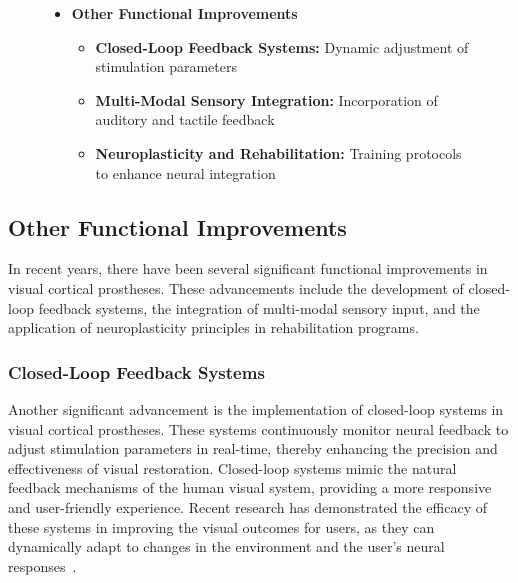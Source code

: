 \documentclass[twocolumn,10pt]{article}
\begin{document}
\begin{figure}[htbp]
\begin{tcolorbox}
\begin{itemize}
                  \item \textbf{Other Functional Improvements}
                        \begin{itemize}
                              \item \textbf{Closed-Loop Feedback Systems:} Dynamic adjustment of stimulation parameters
                              \item \textbf{Multi-Modal Sensory Integration:} Incorporation of auditory and tactile feedback
                              \item \textbf{Neuroplasticity and Rehabilitation:} Training protocols to enhance neural integration
                        \end{itemize}
            \end{itemize}
      \end{tcolorbox}
\end{figure}

\subsection{Other Functional Improvements}
In recent years, there have been several significant functional improvements in
visual cortical prostheses. These advancements include the development of
closed-loop feedback systems, the integration of multi-modal sensory input, and
the application of neuroplasticity principles in rehabilitation programs.

\subsubsection*{Closed-Loop Feedback Systems}
Another significant advancement is the implementation of closed-loop systems in
visual cortical prostheses. These systems continuously monitor neural feedback
to adjust stimulation parameters in real-time, thereby enhancing the precision
and effectiveness of visual restoration. Closed-loop systems mimic the natural
feedback mechanisms of the human visual system, providing a more responsive and
user-friendly experience. Recent research has demonstrated the efficacy of these
systems in improving the visual outcomes for users, as they can dynamically
adapt to changes in the environment and the user's neural
responses~\parencite{leviEditorialClosedLoopSystems2018}.
\end{document}
